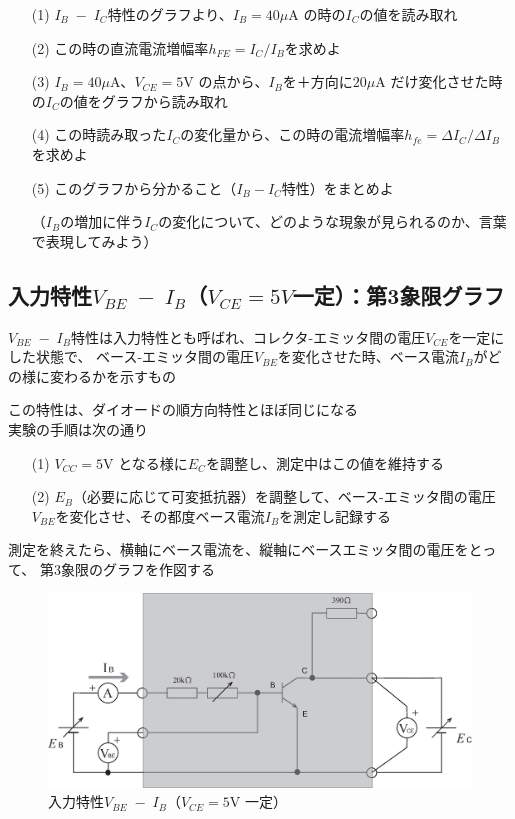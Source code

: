 \documentclass[uplatex,a4paper,11pt,oneside,openany]{jsbook}
\begin{document}
\begin{enumerate}
	\item[(1)] $I_B\;-\;I_C$特性のグラフより、$I_B=40\mu$A の時の$I_C$の値を読み取れ\\
	\item[(2)] この時の直流電流増幅率$h_{FE}=I_C/I_B$を求めよ\\
	\item[(3)] $I_B=40\mu$A、$V_{CE}=5$V の点から、$I_B$を＋方向に$20\mu$A だけ変化させた時の$I_C$の値をグラフから読み取れ\\
	\item[(4)] この時読み取った$I_C$の変化量から、この時の電流増幅率$h_{fe}=\Delta I_C/\Delta I_B$を求めよ\\
	\item[(5)] このグラフから分かること（$I_B-I_C$特性）をまとめよ
	
	（$I_B$の増加に伴う$I_C$の変化について、どのような現象が見られるのか、言葉で表現してみよう）
\end{enumerate}

\newpage

\subsection{入力特性$V_{BE}\;-\;I_B$（$V_{CE}=5V$一定）：第3象限グラフ}

$V_{BE}\;-\;I_B$特性は入力特性とも呼ばれ、コレクタ-エミッタ間の電圧$V_{CE}$を一定にした状態で、
ベース-エミッタ間の電圧$V_{BE}$を変化させた時、ベース電流$I_B$がどの様に変わるかを示すもの

この特性は、ダイオードの順方向特性とほぼ同じになる\\

実験の手順は次の通り

\begin{enumerate}
	\item[(1)] $V_{CC}=5$V となる様に$E_C$を調整し、測定中はこの値を維持する
	\item[(2)] $E_B$（必要に応じて可変抵抗器）を調整して、ベース-エミッタ間の電圧$V_{BE}$を変化させ、その都度ベース電流$I_B$を測定し記録する
\end{enumerate}

測定を終えたら、横軸にベース電流を、縦軸にベースエミッタ間の電圧をとって、
第3象限のグラフを作図する

\vfill

\begin{figure}[H]
	\centering
	\includegraphics[keepaspectratio, scale=0.45, angle=0]
	{figs/eps/ex3.eps}
	\caption{入力特性$V_{BE}\;-\;I_B$（$V_{CE}=5$V 一定）}
	\label{fig:ex3}
\end{figure}
\end{document}
